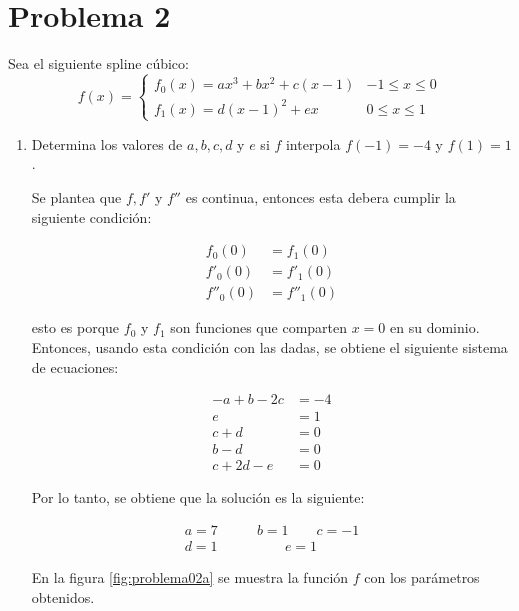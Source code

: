 \section*{Problema 2}
Sea el siguiente spline cúbico:
\begin{equation*}
	f(x) = \begin{cases}
		f_0(x)= ax^3+bx^2+c(x-1) & -1\leq x \leq 0 \\
		f_1(x) = d(x-1)^2 +ex    & 0\leq x \leq 1
	\end{cases}
\end{equation*}
\begin{enumerate}
	\item Determina los valores de $a,b,c,d$ y $e$ si $f$ interpola $f(-1)=-4$ y $f(1)=1$.

	      Se plantea que $f,f'$ y $f''$ es continua, entonces esta debera cumplir la siguiente condición:

	      \begin{align*}
		      f_0(0)   & = f_1(0)   \\
		      f'_0(0)  & = f'_1(0)  \\
		      f''_0(0) & = f''_1(0)
	      \end{align*}

	      esto es porque $f_0$ y $f_1$  son funciones que comparten $x=0$ en su dominio. Entonces, usando esta condición con las dadas, se obtiene el siguiente sistema de ecuaciones:

	      \begin{align*}
		      -a+b-2c & = -4 \\
		      e       & = 1  \\
		      c+d     & = 0  \\
		      b-d     & =0   \\
		      c+2d-e  & = 0
	      \end{align*}

	      Por lo tanto, se obtiene que la solución es la siguiente:

	      \begin{align*}
		      a = 7 \qquad & b = 1 \qquad c= -1 \\
		      d = 1        & \qquad e=1
	      \end{align*}

	      En la figura \ref{fig:problema02a} se muestra la función $f$ con los parámetros obtenidos.


\end{enumerate}
